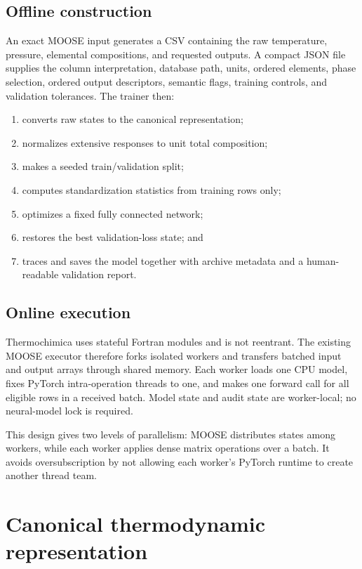 \documentclass[11pt]{article}
\begin{document}
\subsection{Offline construction}

An exact MOOSE input generates a CSV containing the raw temperature, pressure, elemental
compositions, and requested outputs.  A compact JSON file supplies the column interpretation,
database path, units, ordered elements, phase selection, ordered output descriptors, semantic
flags, training controls, and validation tolerances.  The trainer then:
\begin{enumerate}[leftmargin=*]
  \item converts raw states to the canonical representation;
  \item normalizes extensive responses to unit total composition;
  \item makes a seeded train/validation split;
  \item computes standardization statistics from training rows only;
  \item optimizes a fixed fully connected network;
  \item restores the best validation-loss state; and
  \item traces and saves the model together with archive metadata and a human-readable validation
  report.
\end{enumerate}

\subsection{Online execution}

Thermochimica uses stateful Fortran modules and is not reentrant.  The existing MOOSE executor
therefore forks isolated workers and transfers batched input and output arrays through shared
memory.  Each worker loads one CPU model, fixes PyTorch intra-operation threads to one, and makes
one forward call for all eligible rows in a received batch.  Model state and audit state are
worker-local; no neural-model lock is required.

This design gives two levels of parallelism: MOOSE distributes states among workers, while each
worker applies dense matrix operations over a batch.  It avoids oversubscription by not allowing
each worker's PyTorch runtime to create another thread team.

\section{Canonical thermodynamic representation}
\end{document}
